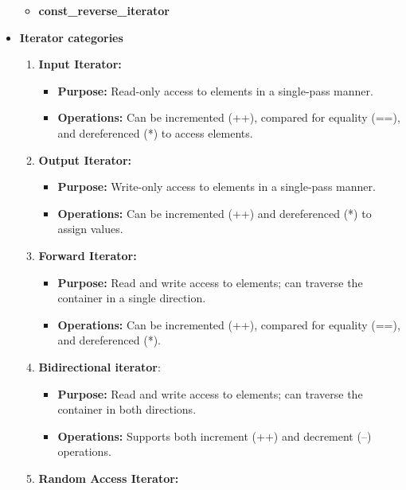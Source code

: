 \documentclass{report}
\begin{document}
\begin{itemize}
\begin{itemize}
                \item \textbf{const\_reverse\_iterator}
            \end{itemize}
        \item \textbf{Iterator categories}
            \begin{enumerate}
                \item \textbf{Input Iterator:}
                    \begin{itemize}
                        \item \textbf{Purpose:} Read-only access to elements in a single-pass manner.
                        \item \textbf{Operations:} Can be incremented (++), compared for equality (==), and dereferenced (*) to access elements.
                    \end{itemize}
                \item \textbf{Output Iterator:}
                    \begin{itemize}
                        \item \textbf{Purpose:} Write-only access to elements in a single-pass manner.
                        \item \textbf{Operations:} Can be incremented (++) and dereferenced (*) to assign values.
                    \end{itemize}
                \item \textbf{Forward Iterator:}
                    \begin{itemize}
                        \item \textbf{Purpose:} Read and write access to elements; can traverse the container in a single direction.
                        \item \textbf{Operations:} Can be incremented (++), compared for equality (==), and dereferenced (*).
                    \end{itemize}
                \item \textbf{Bidirectional iterator}:
                    \begin{itemize}
                        \item \textbf{Purpose:} Read and write access to elements; can traverse the container in both directions.
                        \item \textbf{Operations:} Supports both increment (++) and decrement (--) operations.
                    \end{itemize}
                    \pagebreak 
                \item \textbf{Random Access Iterator:}

\end{enumerate}
\end{itemize}
\end{document}
